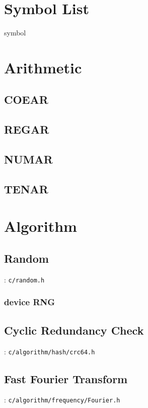 
\section{Symbol List}
{symbol}

\section{Arithmetic}

\subsection{COEAR}
\subsection{REGAR}
\subsection{NUMAR}
\subsection{TENAR}

\section{Algorithm}

\subsection{Random}
: \verb`c/random.h`

\subsubsection{device RNG}

\subsection{Cyclic Redundancy Check}

: \verb`c/algorithm/hash/crc64.h`

\subsection{Fast Fourier Transform}

: \verb`c/algorithm/frequency/Fourier.h`

